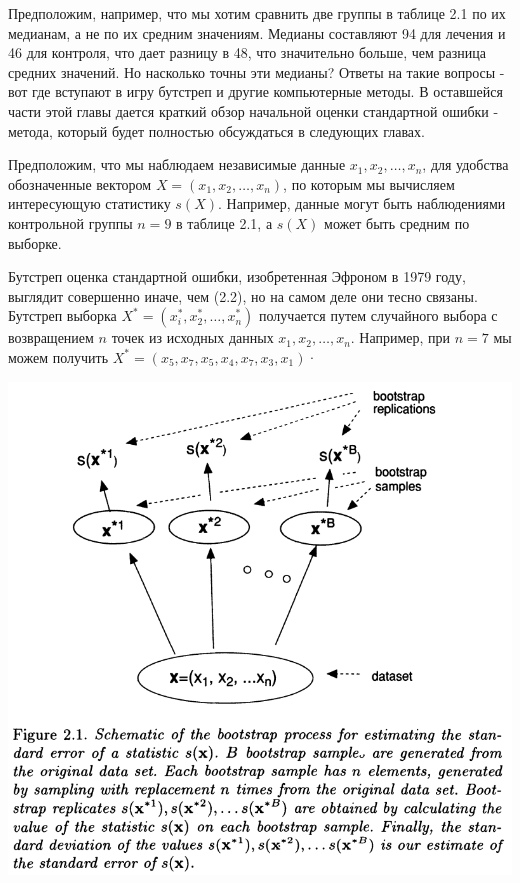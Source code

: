 Предположим, например, что мы хотим сравнить две группы в таблице 2.1 по их медианам, а не по их средним значениям. Медианы составляют 94 для лечения и 46 для контроля, что дает разницу в 48, что значительно больше, чем разница средних значений. Но насколько точны эти медианы? Ответы на такие вопросы - вот где вступают в игру бутстреп и другие компьютерные методы. В оставшейся части этой главы дается краткий обзор начальной оценки стандартной ошибки - метода, который будет полностью обсуждаться в следующих главах. 

Предположим, что мы наблюдаем независимые данные $x_1, x_2,\ldots, x_n$, для удобства обозначенные вектором $X = (x_1, x_2, \ldots, x_n)$, по которым мы вычисляем интересующую статистику $s(X)$. Например, данные могут быть наблюдениями контрольной группы $n = 9$ в таблице 2.1, а $s(X)$ может быть средним по выборке. 

Бутстреп оценка стандартной ошибки, изобретенная Эфроном в 1979 году, выглядит совершенно иначе, чем (2.2), но на самом деле они тесно связаны. Бутстреп выборка $X^* = (x^*_i, x^*_2,\ldots, x^*_n)$ получается путем случайного выбора с возвращением $n$ точек из исходных данных $x_1, x_2,\ldots, x_n$. Например, при $n = 7$ мы можем получить $X^* = (x_5, x_7, x_5, x_4, x_7, x_3, x_1)$· 
\newline

\noindent
\includegraphics[width=\linewidth]{1/f1.png}
\newline

